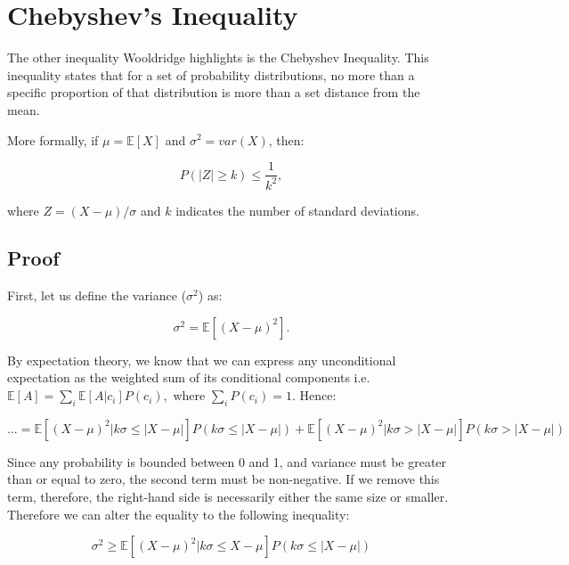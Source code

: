 \documentclass[
]{book}
\begin{document}
\hypertarget{chebyshevs-inequality}{%
\section{Chebyshev's Inequality}\label{chebyshevs-inequality}}

The other inequality Wooldridge highlights is the Chebyshev Inequality. This inequality states that for a set of probability distributions, no more than a specific proportion of that distribution is more than a set distance from the mean.

More formally, if \(\mu = \mathbb{E}[X]\) and \(\sigma^2 = var(X)\), then:

\begin{equation}
    P(|Z| \geq k) \leq \frac{1}{k^2}, 
\end{equation}

where \(Z = (X-\mu)/\sigma\) \citep[p.64]{WassermanAllStatisticsConcise2004} and \(k\) indicates the number of standard deviations.

\hypertarget{proof}{%
\subsection{Proof}\label{proof}}

First, let us define the variance (\(\sigma^2\)) as:

\begin{equation}
    \sigma^2 = \mathbb{E}[(X-\mu)^2].
\end{equation}

By expectation theory, we know that we can express any unconditional expectation as the weighted sum of its conditional components i.e.~\(\mathbb{E}[A] = \sum_i\mathbb{E}[A|c_i]P(c_i),\) where \(\sum_iP(c_i)=1\). Hence:

\begin{equation}
    ... = \mathbb{E}[(X-\mu)^2 | k\sigma \leq |X - \mu|]P(k\sigma \leq |X - \mu|) + \mathbb{E}[(X-\mu)^2 | k\sigma > |X - \mu|]P(k\sigma > |X - \mu|) 
\end{equation}

Since any probability is bounded between 0 and 1, and variance must be greater than or equal to zero, the second term must be non-negative. If we remove this term, therefore, the right-hand side is necessarily either the same size or smaller. Therefore we can alter the equality to the following inequality:

\begin{equation}
    \sigma^2 \geq \mathbb{E}[(X-\mu)^2 | k\sigma \leq X - \mu]P(k\sigma \leq |X - \mu|)
\end{equation}
\end{document}
